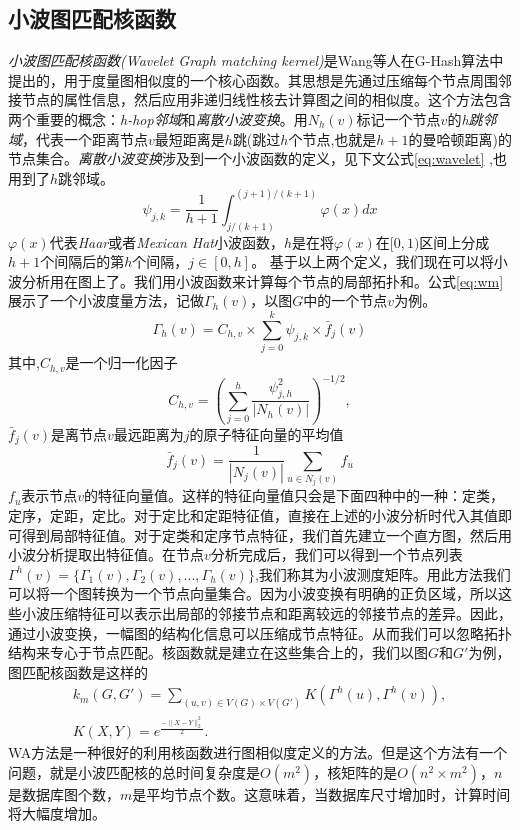 \documentclass{XDBAthesis}
\begin{document}
\subsection{小波图匹配核函数}
\emph{小波图匹配核函数(Wavelet Graph matching kernel)}\cite{ghash}是Wang等人在G-Hash算法中提出的，用于度量图相似度的一个核心函数。其思想是先通过压缩每个节点周围邻接节点的属性信息，然后应用非递归线性核去计算图之间的相似度。这个方法包含两个重要的概念：\emph{h-hop邻域}和\emph{离散小波变换}。用$N_h (v)$标记一个节点$v$的\emph{h跳邻域}，代表一个距离节点$v$最短距离是$h$跳(跳过$h$个节点,也就是$h+1$的曼哈顿距离)的节点集合。\emph{离散小波变换}涉及到一个小波函数的定义，见下文公式\ref{eq:wavelet} ,也用到了$h$跳邻域。
\begin{equation}
    \psi_{j,k}=\frac{1}{h+1}\int_{j/(k+1)}^{(j+1)/(k+1)}\varphi(x)dx
    \label{eq:wavelet}
\end{equation}
$\varphi(x)$代表\emph{Haar}或者\emph{Mexican Hat}小波函数，$h$是在将$\varphi(x)$在$[0,1)$区间上分成$h+1$个间隔后的第$h$个间隔，$j\in[0,h]$。
基于以上两个定义，我们现在可以将小波分析用在图上了。我们用小波函数来计算每个节点的局部拓扑和。公式\eqref{eq:wm}展示了一个小波度量方法，记做$\Gamma_h (v)$，以图$G$中的一个节点$v$为例。
\begin{equation}
    \Gamma_h (v)=C_{h,v}\times\sum_{j=0}^k \psi_{j,k}\times\bar{f}_j (v)
    \label{eq:wm}
\end{equation}
其中,$C_{h,v}$是一个归一化因子
\begin{equation}
    C_{h,v}=(\sum_{j=0}^h \frac{\psi_{j,h}^2 }{|N_h (v)|})^{-1/2},
\end{equation}
$\bar{f}_{j}(v)$是离节点$v$最远距离为$j$的原子特征向量的平均值
\begin{equation}
    \bar{f}_{j}(v)=\frac{1}{|N_{j}(v)|}\sum_{u\in N_{j}(v)}f_u
\end{equation}
$f_u $表示节点$v$的特征向量值。这样的特征向量值只会是下面四种中的一种：定类，定序，定距，定比。对于定比和定距特征值，直接在上述的小波分析时代入其值即可得到局部特征值。对于定类和定序节点特征，我们首先建立一个直方图，然后用小波分析提取出特征值。在节点$v$分析完成后，我们可以得到一个节点列表$\Gamma^h (v)=\{\Gamma_{1}(v),\Gamma_{2}(v),...,\Gamma_{h}(v)\}$,我们称其为小波测度矩阵。用此方法我们可以将一个图转换为一个节点向量集合。因为小波变换有明确的正负区域，所以这些小波压缩特征可以表示出局部的邻接节点和距离较远的邻接节点的差异。因此，通过小波变换，一幅图的结构化信息可以压缩成节点特征。从而我们可以忽略拓扑结构来专心于节点匹配。核函数就是建立在这些集合上的，我们以图$G$和$G'$为例，图匹配核函数是这样的
\begin{gather}
    k_{m}(G,G')=\sum_{(u,v)\in V(G)\times V(G')}K(\Gamma^{h}(u),\Gamma^h (v) ), \\
    K(X,Y)=e^{\frac{-\|X-Y\|_{2}^{2}}{2}}.
\end{gather}
WA方法是一种很好的利用核函数进行图相似度定义的方法。但是这个方法有一个问题，就是小波匹配核的总时间复杂度是$O(m^2 )$，核矩阵的是$O(n^2 \times m^2 )$，$n$是数据库图个数，$m$是平均节点个数。这意味着，当数据库尺寸增加时，计算时间将大幅度增加。
\end{document}
